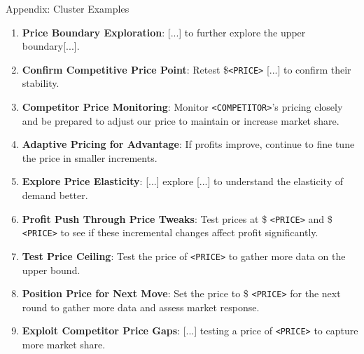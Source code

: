 \documentclass[10pt, aspectratio=169]{beamer}
\begin{document}

\begin{frame}{Appendix: Cluster Examples}\label{app:cluster_examples}
\begin{enumerate}
    \item \textbf{Price Boundary Exploration}: [...] to further explore the upper boundary[...].
    \item \textbf{Confirm Competitive Price Point}: Retest \$\texttt{<PRICE>} [...] to confirm their stability.
    \item \textbf{Competitor Price Monitoring}: Monitor \texttt{<COMPETITOR>}'s pricing closely and be prepared to adjust our price to maintain or increase market share.
    \item \textbf{Adaptive Pricing for Advantage}: If profits improve, continue to fine tune the price in smaller increments.
    \item \textbf{Explore Price Elasticity}: [...] explore [...] to understand the elasticity of demand better.
    \item \textbf{Profit Push Through Price Tweaks}: Test prices at \$ \texttt{<PRICE>} and \$ \texttt{<PRICE>} to see if these incremental changes affect profit significantly.
    \item \textbf{Test Price Ceiling}: Test the price of \texttt{<PRICE>} to gather more data on the upper bound.
    \item \textbf{Position Price for Next Move}: Set the price to \$ \texttt{<PRICE>} for the next round to gather more data and assess market response.
    \item \textbf{Exploit Competitor Price Gaps}: [...] testing a price of \texttt{<PRICE>} to capture more market share.\hfill\hyperlink{slide:cluster_approach}{}
\end{enumerate}
\end{frame}
\end{document}
